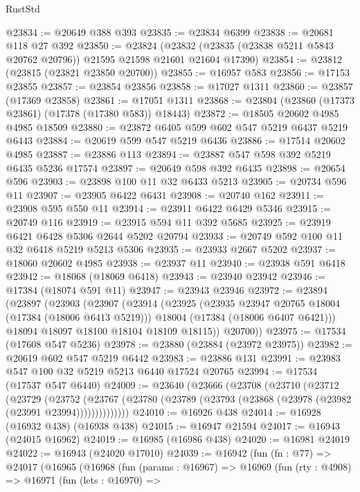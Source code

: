\begin{lexlean}{RustStd}
\begin{coremodule}
@23834 := @20649 @388 @393
@23835 := @23834 @6399
@23838 := @20681 @118 @27 @392
@23850 := @23824
    (@23832 (@23835 (@23838 @5211 @5843 @20762 @20796)) @21595 @21598 @21601 @21604 @17390)
@23854 := @23812 (@23815 (@23821 @23850 @20700))
@23855 := @16957 @583
@23856 := @17153 @23855
@23857 := @23854 @23856
@23858 := @17027 @1311
@23860 := @23857 (@17369 @23858)
@23861 := @17051 @1311
@23868 := @23804 (@23860 (@17373 @23861) (@17378 (@17380 @583)) @18443)
@23872 := @18505 @20602 @4985 @4985 @18509
@23880 := @23872 @6405 @599 @602 @547 @5219 @6437 @5219 @6443
@23884 := @20619 @599 @547 @5219 @6436
@23886 := @17514 @20602 @4985
@23887 := @23886 @113
@23894 := @23887 @547 @598 @392 @5219 @6435 @5236 @17574
@23897 := @20649 @598 @392 @6435
@23898 := @20654 @596
@23903 := @23898 @100 @11 @32 @6433 @5213
@23905 := @20734 @596 @11
@23907 := @23905 @6422 @6431
@23908 := @20740 @162
@23911 := @23908 @595 @550 @11
@23914 := @23911 @6422 @6429 @5346
@23915 := @20749 @116
@23919 := @23915 @594 @11 @392 @5685
@23925 := @23919 @6421 @6428 @5306 @2644 @5202 @20794
@23933 := @20749 @592 @100 @11 @32 @6418 @5219 @5213 @5306
@23935 := @23933 @2667 @5202
@23937 := @18060 @20602 @4985
@23938 := @23937 @11
@23940 := @23938 @591 @6418
@23942 := @18068 (@18069 @6418)
@23943 := @23940 @23942
@23946 := @17384 (@18074 @591 @11)
@23947 := @23943 @23946
@23972 := @23894
    (@23897
      (@23903
        (@23907
          (@23914
            (@23925
              (@23935 @23947 @20765 @18004 (@17384 (@18006 @6413 @5219)))
              @18004
              (@17384 (@18006 @6407 @6421)))
            @18094
            @18097
            @18100
            @18104
            @18109
            @18115))
        @20700))
@23975 := @17534 (@17608 @547 @5236)
@23978 := @23880 (@23884 (@23972 @23975))
@23982 := @20619 @602 @547 @5219 @6442
@23983 := @23886 @131
@23991 := @23983 @547 @100 @32 @5219 @5213 @6440 @17524 @20765
@23994 := @17534 (@17537 @547 @6440)
@24009 := @23640
    (@23666
      (@23708
        (@23710
          (@23712
            (@23729
              (@23752
                (@23767 (@23780 (@23789 (@23793 (@23868 (@23978 (@23982 (@23991 @23994))))))))))))))
@24010 := @16926 @438
@24014 := @16928 (@16932 @438) (@16938 @438)
@24015 := @16947 @21594
@24017 := @16943 (@24015 @16962)
@24019 := @16985 (@16986 @438)
@24020 := @16981 @24019
@24022 := @16943 (@24020 @17010)
@24039 := @16942
    (fun (fn : @77) =>
    @24017
      (@16965
        (@16968
          (fun (params : @16967) =>
          @16969
            (fun (rty : @4908) =>
            @16971
              (fun (lets : @16970) =>

\end{coremodule}
\end{lexlean}
